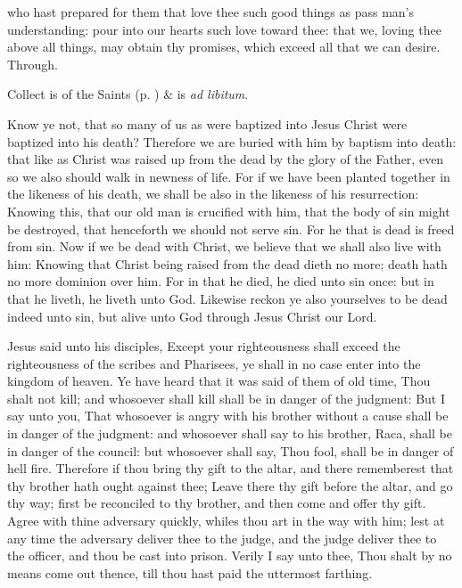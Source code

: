 \collect
{} who hast prepared for them that love thee such good things as pass man's understanding: pour into our hearts such love toward thee: that we, loving thee above all things, may obtain thy promises, which exceed all that we can desire. Through.
\begin{rubric}
     Collect is of the Saints (p. \pageref{SPSaints}) \&  is \emph{ad libitum}.
\end{rubric}

 Know ye not, that so many of us as were baptized into Jesus Christ were baptized into his death? Therefore we are buried with him by baptism into death: that like as Christ was raised up from the dead by the glory of the Father, even so we also should walk in newness of life. For if we have been planted together in the likeness of his death, we shall be also in the likeness of his resurrection: Knowing this, that our old man is crucified with him, that the body of sin might be destroyed, that henceforth we should not serve sin. For he that is dead is freed from sin. Now if we be dead with Christ, we believe that we shall also live with him: Knowing that Christ being raised from the dead dieth no more; death hath no more dominion over him. For in that he died, he died unto sin once: but in that he liveth, he liveth unto God. Likewise reckon ye also yourselves to be dead indeed unto sin, but alive unto God through Jesus Christ our Lord.


 Jesus said unto his disciples, Except your righteousness shall exceed the righteousness of the scribes and Pharisees, ye shall in no case enter into the kingdom of heaven. Ye have heard that it was said of them of old time, Thou shalt not kill; and whosoever shall kill shall be in danger of the judgment: But I say unto you, That whosoever is angry with his brother without a cause shall be in danger of the judgment: and whosoever shall say to his brother, Raca, shall be in danger of the council: but whosoever shall say, Thou fool, shall be in danger of hell fire. Therefore if thou bring thy gift to the altar, and there rememberest that thy brother hath ought against thee; Leave there thy gift before the altar, and go thy way; first be reconciled to thy brother, and then come and offer thy gift. Agree with thine adversary quickly, whiles thou art in the way with him; lest at any time the adversary deliver thee to the judge, and the judge deliver thee to the officer, and thou be cast into prison. Verily I say unto thee, Thou shalt by no means come out thence, till thou hast paid the uttermost farthing.

